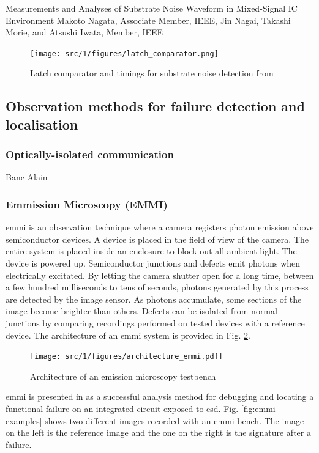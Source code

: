 Measurements and Analyses of Substrate Noise Waveform in Mixed-Signal IC Environment Makoto Nagata, Associate Member, IEEE, Jin Nagai, Takashi Morie, and Atsushi Iwata, Member, IEEE

\begin{figure}[!h]
  \centering
  \texttt{[image: src/1/figures/latch\_comparator.png]}
  \caption{Latch comparator and timings for substrate noise detection from \cite{}}
  \label{fig:noise-detect-latch-comparator}
\end{figure}

\subsection{Observation methods for failure detection and localisation}

\subsubsection{Optically-isolated communication}

Banc Alain

\subsubsection{Emmission Microscopy (EMMI)}

\gls{emmi} is an observation technique where a camera registers photon emission above semiconductor devices.
A device is placed in the field of view of the camera.
The entire system is placed inside an enclosure to block out all ambient light.
The device is powered up.
Semiconductor junctions and defects emit photons when electrically excitated.
By letting the camera shutter open for a long time, between a few hundred milliseconds to tens of seconds, photons generated by this process are detected by the image sensor.
As photons accumulate, some sections of the image become brighter than others.
Defects can be isolated from normal junctions by comparing recordings performed on tested devices with a reference device.
The architecture of an \gls{emmi} system is provided in Fig. \ref{fig:emmi}.

\begin{figure}[!h]
  \centering
  \texttt{[image: src/1/figures/architecture\_emmi.pdf]}
  \caption{Architecture of an emission microscopy testbench}
  \label{fig:emmi}
\end{figure}

\gls{emmi} is presented in \cite{softfailEMMI} as a successful analysis method for debugging and locating a functional failure on an integrated circuit exposed to \gls{esd}.
Fig. \ref{fig:emmi-examples} shows two different images recorded with an \gls{emmi} bench.
The image on the left is the reference image and the one on the right is the signature after a failure.

